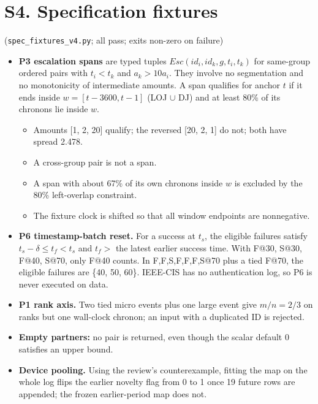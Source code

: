 \documentclass[10pt]{article}
\newcommand{\tf}[1]{\texttt{#1}}
\newcommand{\rel}[1]{\mathit{#1}}
\begin{document}
\section*{S4. Specification fixtures} (\tf{spec\_fixtures\_v4.py}; all pass; exits non-zero on failure)
\begin{itemize}\itemsep1pt
\item \textbf{P3 escalation spans} are typed tuples $\rel{Esc}(id_i,id_k,g,t_i,t_k)$ for same-group ordered pairs with $t_i<t_k$ and $a_k>10a_i$. They involve no segmentation and no monotonicity of intermediate amounts. A span qualifies for anchor $t$ if it ends inside $w=[t-3600,t-1]$ (LOJ $\cup$ DJ) and at least 80\% of its chronons lie inside $w$.
\begin{itemize}
\item Amounts [1, 2, 20] qualify; the reversed [20, 2, 1] do not; both have spread 2.478.
\item A cross-group pair is not a span.
\item A span with about 67\% of its own chronons inside $w$ is excluded by the 80\% left-overlap constraint.
\item The fixture clock is shifted so that all window endpoints are nonnegative.
\end{itemize}
\item \textbf{P6 timestamp-batch reset.} For a success at $t_s$, the eligible failures satisfy $t_s-\delta\le t_f<t_s$ and $t_f>$ the latest earlier success time. With F@30, S@30, F@40, S@70, only F@40 counts. In F,F,S,F,F,F,S@70 plus a tied F@70, the eligible failures are \{40, 50, 60\}. IEEE-CIS has no authentication log, so P6 is never executed on data.
\item \textbf{P1 rank axis.} Two tied micro events plus one large event give $m/n=2/3$ on ranks but one wall-clock chronon; an input with a duplicated ID is rejected.
\item \textbf{Empty partners:} no pair is returned, even though the scalar default 0 satisfies an upper bound.
\item \textbf{Device pooling.} Using the review's counterexample, fitting the map on the whole log flips the earlier novelty flag from 0 to 1 once 19 future rows are appended; the frozen earlier-period map does not.
\end{itemize}
\end{document}
